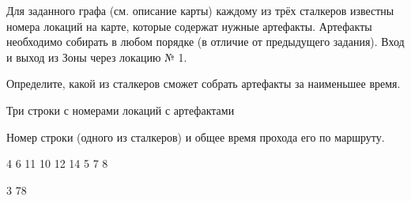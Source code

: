 
Для заданного графа (см. описание карты) каждому из трёх сталкеров известны номера локаций на карте, которые содержат нужные артефакты. Артефакты необходимо собирать в любом порядке (в отличие от предыдущего задания). Вход и выход из Зоны через локацию № 1.

Определите, какой из сталкеров сможет собрать артефакты за наименьшее время.


Три строки с номерами локаций с артефактами

\outputfmtSection

Номер строки (одного из сталкеров) и общее время прохода его по маршруту.

\begin{myverbbox}[\small]{\vinput}
    4 6 11
    10 12 14
    5 7 8
\end{myverbbox}
\begin{myverbbox}[\small]{\voutput}
    3 78
\end{myverbbox}

